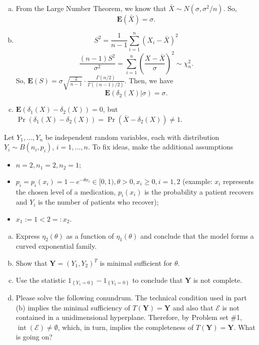 \begin{solution}
    \begin{enumerate}[(a)]
        \item From the Large Number Theorem, we know that $\bar{X}\sim N(\sigma, \sigma^2/n)$. So, 
        \[
            \mathbf{E}(\bar{X})=\sigma. 
        \]
        \item \[S^2=\frac{1}{n-1}\sum_{i=1}^n(X_i-\bar{X})^2\]
        \[
            \frac{(n-1)S^2}{\sigma^2}=\sum_{i=1}^n(\frac{X-\bar{X}}{\sigma})^2\sim\chi_n^2. 
        \]
        So, $\mathbf{E}(S)=\sigma\sqrt{\frac{2}{n-1}}\cdot \frac{\Gamma(n/2)}{\Gamma((n-1)/2)}$. Then, we have
        \[
            \mathbf{E}(\delta_2(X)|\sigma)=\sigma. 
        \]
        \item $\mathbf{E}(\delta_1(X)-\delta_2(X))=0$, but $\Pr(\delta_1(X)-\delta_2(X))=\Pr(\bar{X}-\delta_2(X))\neq 1$. 
    \end{enumerate}
\end{solution}

\begin{ex}
    Let \(Y_{1}, \ldots, Y_{n}\) be independent random variables, each with distribution \(Y_{i} \sim B\left(n_{i}, p_{i}\right)\), \(i=1, \ldots, n\). To fix ideas, make the additional assumptions
    \begin{itemize}
        \item \(n=2, n_{1}=2, n_{2}=1 ;\)
        \item \(p_{i}=p_{i}\left(x_{i}\right)=1-e^{-\theta x_{i}} \in[0,1), \theta>0, x_{i} \geq 0, i=1,2\) (example: \(x_{i}\) represents the chosen level of a medication, \(p_{i}\left(x_{i}\right)\) is the probability a patient recovers and \(Y_{i}\) is the number of patients who recover); 
        \item \(x_{1}:=1<2=: x_{2}\).
    \end{itemize}
    \begin{enumerate}[(a)]
        \item Express \(\eta_{2}(\theta)\) as a function of \(\eta_{1}(\theta)\) and conclude that the model forms a curved exponential family. 
        \item Show that \(\mathbf{Y}=\left(Y_{1}, Y_{2}\right)^{T}\) is minimal sufficient for \(\theta\). 
        \item Use the statistic \(1_{\left\{Y_{1}=0\right\}}-1_{\left\{Y_{2}=0\right\}}\) to conclude that \(\mathbf{Y}\) is not complete. 
        \item Please solve the following conundrum. The technical condition used in part (b) implies the minimal sufficiency of \(T(\mathbf{Y})=\mathbf{Y}\) and also that \(\mathcal{E}\) is not contained in a unidimensional hyperplane. Therefore, by Problem set \#1, \(\operatorname{int}(\mathcal{E}) \neq \emptyset\), which, in turn, implies the completeness of \(T(\mathbf{Y})=\mathbf{Y}\). What is going on? 
    \end{enumerate}
\end{ex}

